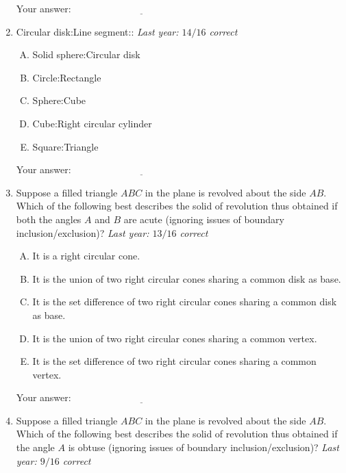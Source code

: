 \documentclass[10pt]{amsart}
\begin{document}
\begin{enumerate}
  
  \vspace{0.3in}
Your answer: $\underline{\qquad\qquad\qquad\qquad\qquad\qquad\qquad}$
  \vspace{0.3in}

\item Circular disk:Line segment:: {\em Last year: $14/16$ correct}

  \begin{enumerate}[(A)]
  \item Solid sphere:Circular disk
  \item Circle:Rectangle
  \item Sphere:Cube
  \item Cube:Right circular cylinder
  \item Square:Triangle
  \end{enumerate}

  
  \vspace{0.3in}
Your answer: $\underline{\qquad\qquad\qquad\qquad\qquad\qquad\qquad}$
  \vspace{0.3in}

\newpage
\item Suppose a filled triangle $ABC$ in the plane is revolved about
  the side $AB$. Which of the following best describes the solid of
  revolution thus obtained if both the angles $A$ and $B$ are acute
  (ignoring issues of boundary inclusion/exclusion)?  {\em Last year:
  $13/16$ correct}

  \begin{enumerate}[(A)]
  \item It is a right circular cone.
  \item It is the union of two right circular cones sharing a common
    disk as base.
  \item It is the set difference of two right circular cones sharing a
    common disk as base.
  \item It is the union of two right circular cones sharing a common
    vertex.
  \item It is the set difference of two right circular cones sharing a
    common vertex.
  \end{enumerate}

  
  \vspace{1in}
Your answer: $\underline{\qquad\qquad\qquad\qquad\qquad\qquad\qquad}$
  \vspace{1in}

\item Suppose a filled triangle $ABC$ in the plane is revolved about
  the side $AB$. Which of the following best describes the solid of
  revolution thus obtained if the angle $A$ is obtuse (ignoring issues
  of boundary inclusion/exclusion)? {\em Last year: $9/16$ correct}


\end{enumerate}
\end{document}
